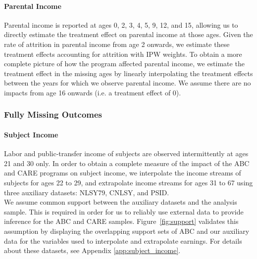 \paragraph{Parental Income}

\noindent Parental income is reported at ages 0, 2, 3, 4, 5, 9, 12, and 15, allowing us to directly estimate
the treatment effect on parental income at those ages. Given the rate of attrition in
parental income from age 2 onwards, we estimate these treatment effects accounting for attrition
with IPW weights.
To obtain a more complete picture of how the
program affected parental income, we estimate the treatment effect in the missing ages by linearly
interpolating the treatment effects between the years for which we observe parental income. We assume
there are no impacts from age 16 onwards (i.e. a treatment effect of 0). \\


\subsubsection{Fully Missing Outcomes}
\label{app:method_noobs}

\paragraph{Subject Income}

\noindent Labor and public-transfer income of subjects are observed intermittently at ages 21 and 30 only. In order
to obtain a complete measure of the impact of the ABC and CARE programs on subject income, we interpolate
the income streams of subjects for ages 22 to 29, and extrapolate income streams for ages
31 to 67 using three auxiliary datasets: NLSY79, CNLSY, and PSID. \\

\noindent We assume common support between the auxiliary
datasets and the analysis sample. This is required in order for us to reliably use external data to provide inference for the ABC and CARE samples. Figure~\ref{fig:support} validates this
assumption by displaying the overlapping support sets of ABC and our auxiliary data for
the variables used to interpolate and extrapolate earnings. For details about these datasets, see Appendix \ref{app:subject_income}. \\


